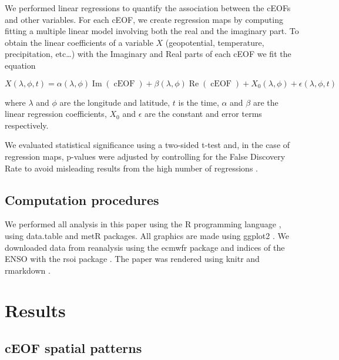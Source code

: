 \documentclass[smallextended]{svjour3}       %
\begin{document}
We performed linear regressions to quantify the association between the cEOFs and other variables.
For each cEOF, we create regression maps by computing fitting a multiple linear model involving both the real and the imaginary part.
To obtain the linear coefficients of a variable \(X\) (geopotential, temperature, precipitation, etc\ldots) with the Imaginary and Real parts of each cEOF we fit the equation

\[
X(\lambda, \phi, t) = \alpha(\lambda, \phi) \operatorname{Im}(\operatorname{cEOF}) + \beta(\lambda, \phi) \operatorname{Re}(\operatorname{cEOF}) + X_0(\lambda, \phi) +  \epsilon(\lambda, \phi, t)
\]

where \(\lambda\) and \(\phi\) are the longitude and latitude, \(t\) is the time, \(\alpha\) and \(\beta\) are the linear regression coefficients, \(X_0\) and \(\epsilon\) are the constant and error terms respectively.

We evaluated statistical significance using a two-sided t-test and, in the case of regression maps, p-values were adjusted by controlling for the False Discovery Rate \citep{benjamini1995, wilks2016} to avoid misleading results from the high number of regressions \citep{walker1914, katz1991}.

\hypertarget{computation-procedures}{%
\subsection{Computation procedures}\label{computation-procedures}}

We performed all analysis in this paper using the R programming language \citep{rcoreteam2020}, using data.table \citep{dowle2020} and metR \citep{campitelli2020} packages.
All graphics are made using ggplot2 \citep{wickham2009}.
We downloaded data from reanalysis using the ecmwfr package \citep{hufkens2020} and indices of the ENSO with the rsoi package \citep{albers2020}.
The paper was rendered using knitr and rmarkdown \citep{xie2015, allaire2019}.

\hypertarget{results}{%
\section{Results}\label{results}}

\hypertarget{ceof-spatial-patterns}{%
\subsection{cEOF spatial patterns}\label{ceof-spatial-patterns}}
\end{document}
